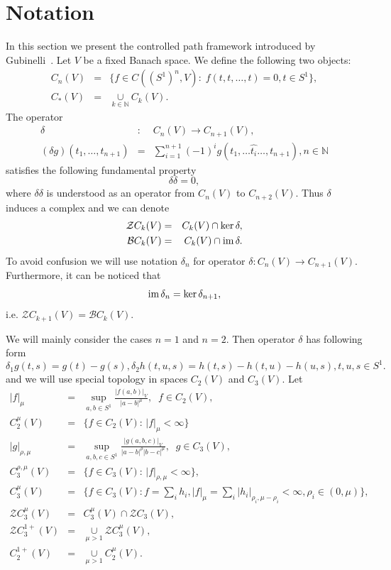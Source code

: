 \documentclass[11pt,a4paper,leqno]{amsart}%
\theoremstyle{plain}
\theoremstyle{remark}
\theoremstyle{plain}
\numberwithin{equation}{section}
\def\Nat{{\mathbb N}}
\def\im{\mbox{im\,}}
\def\suml{\sum\limits}
\def\supl{\sup\limits}
\def\cupl{\mathop{\cup}\limits}
\def\supl{\mathop{\sup}\limits}
\begin{document}
\section{Notation}
In this section we present the controlled path framework introduced by Gubinelli~\cite{[Gubinelli-2004]}.
Let $V$ be a fixed Banach space. We define the following two objects:
\begin{eqnarray*}
C_n(V)&=&\{f\in C((S^1)^n,V):\; f(t,t,\ldots,t)=0,t\in
S^1\},\\
C_*(V)&=&\cupl_{k\in\Nat}C_k(V).
\end{eqnarray*}
The operator
\begin{eqnarray*}
\delta&:&C_n(V)\to C_{n+1}(V),\\
(\delta g)(t_1,\ldots,t_{n+1})&=&\suml_{i=1}^{n+1}(-1)^ig(t_1,\ldots\hat{t_i}\ldots,t_{n+1}),n\in\Nat
\end{eqnarray*}
satisfies the following fundamental property
$$
\delta\delta=0,
$$
where $\delta\delta$ is understood as an operator from $C_n(V)$ to
$C_{n+2}(V)$. Thus $\delta$ induces a complex and we can denote
\begin{eqnarray*}
\mathcal{Z}C_k(V)&=&C_k(V)\cap\ker\delta,\\
\mathcal{B}C_k(V)&=&C_k(V)\cap\im\delta.
\end{eqnarray*}
To avoid confusion we will use notation $\delta_n$ for operator
$\delta:C_n(V)\to C_{n+1}(V)$. Furthermore, it can be noticed that
$$
\im\delta_n=\ker\delta_{n+1},
$$
i.e. $\mathcal{Z}C_{k+1}(V)=\mathcal{B}C_k(V)$.

We will  mainly consider the cases $n=1$ and $n=2$. Then operator $\delta$
has following form
$$
\delta_1g(t,s)=g(t)-g(s),\delta_2h(t,u,s)=h(t,s)-h(t,u)-h(u,s),t,u,s\in
S^1.
$$
and we will use special topology in spaces $C_2(V)$ and $C_3(V)$.
Let
\begin{eqnarray*}
\vert f\vert_{\mu}&=&\supl_{a,b\in S^1}\frac{\vert f(a,b)\vert_{V}}{\vert a-b\vert^{\mu}},\;\;f\in
C_2(V),
\\
C_2^{\mu}(V)&=&\{f\in C_2(V):\, \vert f\vert_{\mu}<\infty\}
\\
\vert g\vert_{\rho,\mu}&=&\supl_{a,b,c\in
S^1}\frac{\vert g(a,b,c)\vert_{V}}{\vert a-b\vert^{\rho}\vert b-c\vert^{\mu}},\;\;g\in
C_3(V),
\\
C_3^{\rho,\mu}(V)&=&\{f\in C_3(V):\, \vert f\vert_{\rho,\mu}<\infty\},
\\
C_3^{\mu}(V)&=&\{f\in
C_3(V): f=\suml_ih_i,\vert f\vert_{\mu}=\suml_i\vert h_i\vert_{\rho_i,\mu-\rho_i}<\infty,\rho_i\in
(0,\mu)\},
\\
\mathcal{Z}C_3^{\mu}(V)&=&C_3^{\mu}(V)\cap\mathcal{Z}C_3(V),
\\
\mathcal{Z}C_3^{1+}(V)&=&\cupl_{\mu>1}\mathcal{Z}C_3^{\mu}(V),\\
C_2^{1+}(V)&=&\cupl_{\mu>1}C_2^{\mu}(V).
\end{eqnarray*}
\end{document}
